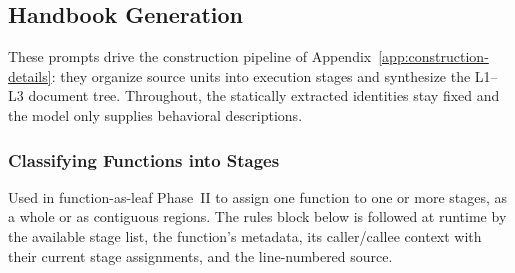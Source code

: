 \documentclass[]{ailab}
\newcommand{\hbsmall}{\textsf{function-as-leaf}}
\begin{document}
\subsection{Handbook Generation}
\label{sec:d-generation}

These prompts drive the construction pipeline of
Appendix~\ref{app:construction-details}: they organize source units into
execution stages and synthesize the L1--L3 document tree. Throughout, the
statically extracted identities stay fixed and the model only supplies behavioral
descriptions.

\subsubsection{Classifying Functions into Stages}

Used in \hbsmall{} Phase~II to assign one function to one or more stages, as a
whole or as contiguous regions. The rules block below is followed at runtime by
the available stage list, the function's metadata, its caller/callee context with
their current stage assignments, and the line-numbered source.
\end{document}
